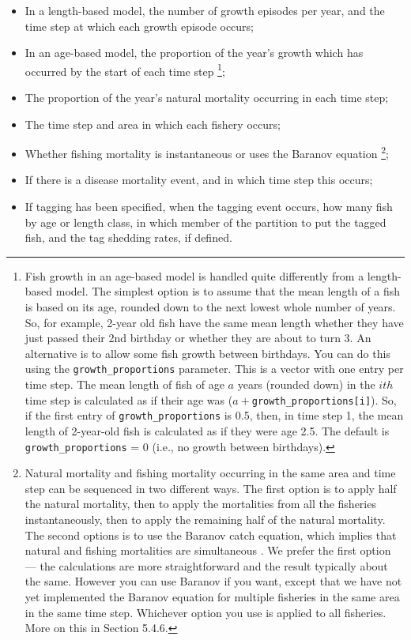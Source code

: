\begin{itemize}
\item	In a length-based model, the number of growth episodes per year, and the time step at which each growth episode occurs;
\item	In an age-based model, the proportion of the year’s growth which has occurred by the start of each time step \footnote{Fish growth in an age-based model is handled quite differently from a length-based model. The simplest option is to assume that the mean length of a fish is based on its age, rounded down to the next lowest whole number of years. So, for example, 2-year old fish have the same mean length whether they have just passed their 2nd birthday or whether they are about to turn 3. An alternative is to allow some fish growth between birthdays. You can do this using the \texttt{growth\_proportions} parameter. This is a vector with one entry per time step. The mean length of fish of age $a$ years (rounded down) in the $ith$ time step is calculated as if their age was ($a+$\texttt{growth\_proportions[i]}). So, if the first entry of \texttt{growth\_proportions} is 0.5, then, in time step 1, the mean length of 2-year-old fish is calculated as if they were age 2.5. The default is \texttt{growth\_proportions} = 0 (i.e., no growth between birthdays).};
\item	The proportion of the year’s natural mortality occurring in each time step;
\item	The time step and area in which each fishery occurs;
\item Whether fishing mortality is instantaneous or uses the Baranov equation \footnote{
  Natural mortality and fishing mortality occurring in the same area and time step can be sequenced in two different ways. The first option is to apply half the natural mortality, then to apply the mortalities from all the fisheries instantaneously, then to apply the remaining half of the natural mortality. The second options is to use the Baranov catch equation, which implies that natural and fishing mortalities are simultaneous . We prefer the first option — the calculations are more straightforward and the result typically about the same. However you can use Baranov if you want, except that we have not yet implemented the Baranov equation for multiple fisheries in the same area in the same time step. Whichever option you use is applied to all fisheries. More on this in Section 5.4.6.
};
\item If there is a disease mortality event, and in which time step this occurs;
\item	If tagging has been specified, when the tagging event occurs, how many fish by age or length class, in which member of the partition to put the tagged fish, and the tag shedding rates, if defined.
\end{itemize}


